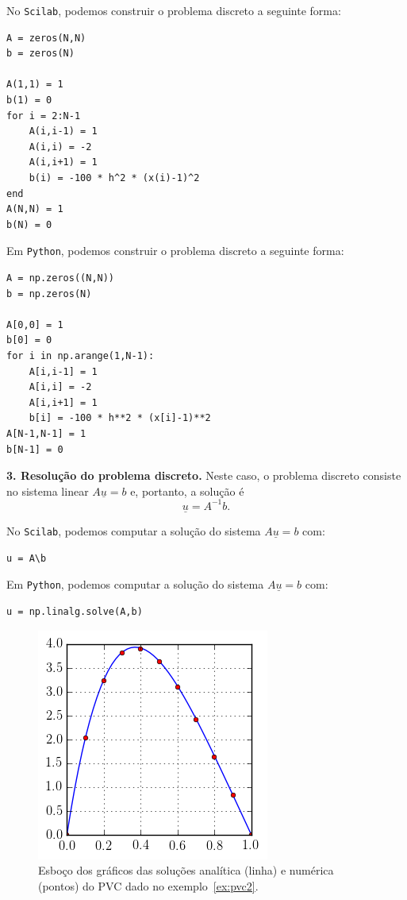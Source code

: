 \begin{sol}
\ifisscilab
No \verb+Scilab+, podemos construir o problema discreto a seguinte forma:
\begin{verbatim}
A = zeros(N,N)
b = zeros(N)

A(1,1) = 1
b(1) = 0
for i = 2:N-1
    A(i,i-1) = 1
    A(i,i) = -2
    A(i,i+1) = 1
    b(i) = -100 * h^2 * (x(i)-1)^2
end
A(N,N) = 1
b(N) = 0
\end{verbatim}
\fi
\ifispython
Em \verb+Python+, podemos construir o problema discreto a seguinte forma:
\begin{verbatim}
A = np.zeros((N,N))
b = np.zeros(N)

A[0,0] = 1
b[0] = 0
for i in np.arange(1,N-1):
    A[i,i-1] = 1
    A[i,i] = -2
    A[i,i+1] = 1
    b[i] = -100 * h**2 * (x[i]-1)**2
A[N-1,N-1] = 1
b[N-1] = 0
\end{verbatim}
\fi

{\bf 3. Resolução do problema discreto.} Neste caso, o problema discreto consiste no sistema linear $A\underline{u} = b$ e, portanto, a solução é
\begin{equation}\label{eq:pvc2_numerica}
  \underline{u} = A^{-1}b.
\end{equation}

\ifisscilab
No \verb+Scilab+, podemos computar a solução do sistema $A\underline{u} = b$ com:
\begin{verbatim}
u = A\b
\end{verbatim}
\fi
\ifispython
Em \verb+Python+, podemos computar a solução do sistema $A\underline{u} = b$ com:
\begin{verbatim}
u = np.linalg.solve(A,b)
\end{verbatim}
\fi

\begin{figure}
  \centering
  \includegraphics{./cap_pvc/pics/ex_pvc2/ex_pvc2}
  \caption{Esboço dos gráficos das soluções analítica (linha) e numérica (pontos) do PVC dado no exemplo~\ref{ex:pvc2}.}
  \label{fig:ex_pvc2}
\end{figure}


\end{sol}
